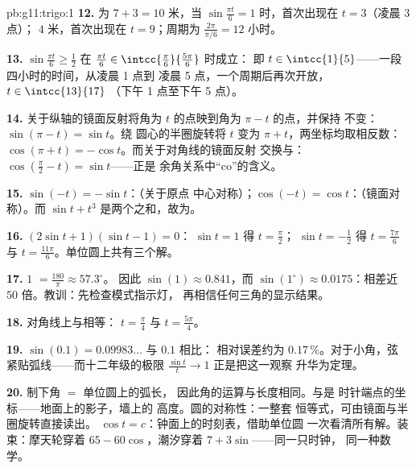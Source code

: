\begin{solution}{pb:g11:trigo:1}
\textbf{12.} 为 $7 + 3 = 10$ 米，当
$\sin\frac{\pi t}{6} = 1$ 时，首次出现在 $t = 3$（凌晨 3 点）；
 $4$ 米，首次出现在 $t = 9$；周期为
$\frac{2\pi}{\pi/6} = 12$ 小时。

\textbf{13.} $\sin\frac{\pi t}{6} \geq \frac12$ 在
$\frac{\pi t}{6} \in \intcc{\frac\pi6}{\frac{5\pi}{6}}$ 时成立：
即 $t \in \intcc{1}{5}$——一段四小时的时间，从凌晨 1 点到
凌晨 5 点，一个周期后再次开放，$t \in \intcc{13}{17}$
（下午 1 点至下午 5 点）。

\textbf{14.} 关于纵轴的镜面反射将角为
$t$ 的点映到角为 $\pi - t$ 的点，并保持
不变：$\sin(\pi - t) = \sin t$。绕
圆心的半圈旋转将 $t$ 变为 $\pi + t$，两坐标均取相反数：
$\cos(\pi + t) = -\cos t$。而关于对角线的镜面反射
交换与：
$\cos\left(\frac\pi2 - t\right) = \sin t$——正是
余角关系中“co”的含义。

\textbf{15.} $\sin(-t) = -\sin t$：（关于原点
中心对称）；$\cos(-t) = \cos t$：（镜面对称）。而
$\sin t + t^3$ 是两个之和，故为。

\textbf{16.}  $(2\sin t + 1)(\sin t - 1) = 0$：
$\sin t = 1$ 得 $t = \frac\pi2$；
$\sin t = -\frac12$ 得 $t = \frac{7\pi}{6}$ 与
$t = \frac{11\pi}{6}$。单位圆上共有三个解。

\textbf{17.} $1$  $= \frac{180}{\pi} \approx 57.3^\circ$。
因此 $\sin(1) \approx 0.841$，而 $\sin(1^\circ) \approx
0.0175$：相差近 $50$ 倍。教训：先检查模式指示灯，
再相信任何三角的显示结果。

\textbf{18.} 对角线上与相等：
$t = \frac\pi4$ 与 $t = \frac{5\pi}{4}$。

\textbf{19.} $\sin(0.1) = 0.09983\ldots$ 与 $0.1$ 相比：
相对误差约为 $0.17\,\%$。对于小角，弦
紧贴弧线——而十二年级的极限
$\frac{\sin t}{t} \to 1$ 正是把这一观察
升华为定理。

\textbf{20.} 制下角 $=$ 单位圆上的弧长，
因此角的运算与长度相同。与是
时针端点的坐标——地面上的影子，墙上的
高度。圆的对称性：一整套
恒等式，可由镜面与半圈旋转直接读出。
$\cos t = c$：钟面上的时刻表，借助单位圆
一次看清所有解。装束：摩天轮穿着
$65 - 60\cos$，潮汐穿着 $7 + 3\sin$——同一只时钟，
同一种数学。
\end{solution}
